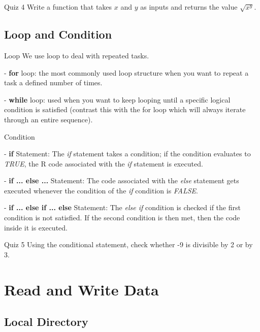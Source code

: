 \documentclass{beamer}
\begin{document}
\begin{frame}{Quiz 4}
    Write a function that takes $x$ and $y$ as inputs and returns the value $\sqrt{x^y}$.
\end{frame}

\subsection{Loop and Condition}

\begin{frame}{Loop}
We use loop to deal with repeated tasks.\\
\hfill

- \textbf{for} loop: the most commonly used loop structure when you want to repeat a task a defined number of times.

- \textbf{while} loop: used when you want to keep looping until a specific logical condition is satisfied (contrast this with the for loop which will always iterate through an entire sequence).

\end{frame}

\begin{frame}{Condition}

- \textbf{if} Statement: The \textit{if} statement takes a condition; if the condition evaluates to \textit{TRUE}, the R code associated with the \textit{if} statement is executed.

- \textbf{if ... else ...} Statement: The code associated with the \textit{else} statement gets executed whenever the condition of the \textit{if} condition is \textit{FALSE}.

- \textbf{if ... else if ... else} Statement: The \textit{else if} condition is checked if the first condition is not satisfied. If the second condition is then met, then the code inside it is executed.

\end{frame}

\begin{frame}{Quiz 5}
Using the conditional statement, check whether -9 is divisible by 2 or by 3.
\end{frame}

\section{Read and Write Data}

\subsection{Local Directory}
\end{document}

